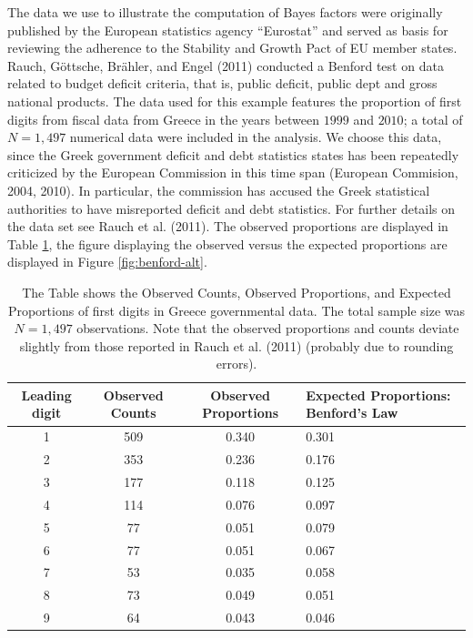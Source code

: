 \documentclass[
  english,
  man,floatsintext]{apa6}
\begin{document}
The data we use to illustrate the computation of Bayes factors were originally published by the European statistics agency \enquote{Eurostat} and served as basis for reviewing the adherence to the Stability and Growth Pact of EU member states. Rauch, Göttsche, Brähler, and Engel (2011) conducted a Benford test on data related to budget deficit criteria, that is, public deficit, public dept and gross national products. The data used for this example features the proportion of first digits from fiscal data from Greece in the years between \(1999\) and \(2010\); a total of \(N= 1{,}497\) numerical data were included in the analysis. We choose this data, since the Greek government deficit and debt statistics states has been repeatedly criticized by the European Commission in this time span (European Commision, 2004, 2010). In particular, the commission has accused the Greek statistical authorities to have misreported deficit and debt statistics. For further details on the data set see Rauch et al. (2011). The observed proportions are displayed in Table \ref{Tab:benford}, the figure displaying the observed versus the expected proportions are displayed in Figure \ref{fig:benford-alt}.

\begin{table}[H]
    \centering
    \caption{The Table shows the Observed Counts, Observed Proportions, and Expected Proportions of first digits in Greece governmental data. The total sample size was $N = 1{,}497$ observations. Note that the observed proportions and counts deviate slightly from those reported in Rauch et al. (2011) (probably due to rounding errors).}
    \begin{tabular}{cccp{4cm}}
        \hline
Leading digit & Observed Counts & Observed Proportions & Expected Proportions: Benford's Law  \\
        \hline
        1 & 509 & 0.340 & 0.301  \\
        2 & 353 & 0.236 & 0.176  \\
        3 & 177 & 0.118 & 0.125  \\
        4 & 114 & 0.076 & 0.097  \\
        5 & 77 & 0.051 & 0.079  \\
        6 & 77 & 0.051 & 0.067  \\
        7 & 53 & 0.035 & 0.058  \\
        8 & 73 & 0.049 & 0.051  \\
        9 & 64 & 0.043 & 0.046  \\
        \hline
    \end{tabular}
    \label{Tab:benford}
\end{table}
\end{document}
